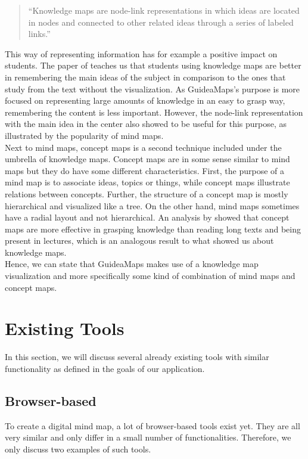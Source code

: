 \begin{quote}
``Knowledge maps are node-link representations in which ideas are located in nodes and connected to other related ideas through a series of labeled links.'' \hfill 
\end{quote}

This way of representing information has for example a positive impact on students. The paper of \cite{knowledgemapsodonnell} teaches us that students using knowledge maps are better in remembering the main ideas of the subject in comparison to the ones that study from the text without the visualization. As GuideaMaps's purpose is more focused on representing large amounts of knowledge in an easy to grasp way, remembering the content is less important. However, the node-link representation with the main idea in the center also showed to be useful for this purpose, as illustrated by the popularity of mind maps.\\

Next to mind maps, concept maps is a second technique included under the umbrella of knowledge maps. Concept maps are in some sense similar to mind maps but they do have some different characteristics. First, the purpose of a mind map is to associate ideas, topics or things, while concept maps illustrate relations between concepts. Further, the structure of a concept map is mostly hierarchical and visualized like a tree. On the other hand, mind maps sometimes have a radial layout and not hierarchical. \citep{davies} An analysis by \cite{nesbit2006conceptmaps} showed that concept maps are more effective in grasping knowledge than reading long texts and being present in lectures, which is an analogous result to what \cite{knowledgemapsodonnell} showed us about knowledge maps. \\

Hence, we can state that GuideaMaps makes use of a knowledge map visualization and more specifically some kind of combination of mind maps and concept maps.



\section{Existing Tools}\label{sec:existing-tools}
In this section, we will discuss several already existing tools with similar functionality as defined in the goals of our application.

\subsection{Browser-based}
To create a digital mind map, a lot of browser-based tools exist yet. They are all very similar and only differ in a small number of functionalities. Therefore, we only discuss two examples of such tools.\\

